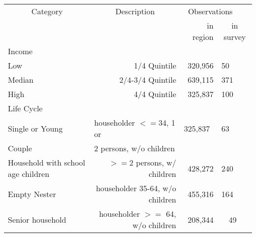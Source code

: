 \begin{tabular}{lrrrr}

\multicolumn{ 1}{c}{Category} & \multicolumn{ 1}{c}{Description} & \multicolumn{ 2}{c}{Observations} &            \\

\multicolumn{ 1}{c}{} & \multicolumn{ 1}{c}{} &  in region & \multicolumn{ 2}{|c}{in survey} \\
\hline
                      \multicolumn{ 1}{l}{Income} &            \\
\hline
       Low & 1/4 Quintile &    320,956 & \multicolumn{ 2}{l}{50} \\
\hline
    Median & 2/4-3/4 Quintile &    639,115 & \multicolumn{ 2}{l}{371} \\
\hline
      High & 4/4 Quintile &    325,837 & \multicolumn{ 2}{l}{100} \\
\hline
                  \multicolumn{ 1}{l}{Life Cycle} &            \\
\hline
Single or Young & \multicolumn{ 1}{l}{householder $<=$34, 1 or } & \multicolumn{ 1}{l}{325,837} & \multicolumn{ 2}{l}{63} \\

    Couple & \multicolumn{ 1}{l}{2 persons, w/o children} & \multicolumn{ 1}{l}{} &   \multicolumn{ 2}{l}{} \\
\hline
Household with school age children & $>=$2 persons, w/ children &    428,272 & \multicolumn{ 2}{l}{240} \\
\hline
Empty Nester & householder 35-64, w/o children &    455,316 & \multicolumn{ 2}{l}{164} \\
\hline
Senior household & householder $>=$ 64, w/o children &    208,344 &         49 &            \\

\end{tabular}  

